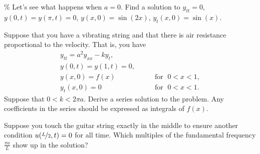 \documentclass{ximera}
\begin{document}
\begin{exercise}\%
    Let's see what happens when $a=0$.  Find a solution to $y_{tt} = 0$, $y(0,t) = y(\pi,t) = 0$, $y(x,0) = \sin(2x)$, $y_t(x,0) = \sin(x)$.
\end{exercise}

\begin{exercise}[challenging]
    Suppose that you have a vibrating string and that there is air resistance proportional to the velocity.  That is, you have
    \begin{equation*}
    \begin{array}{ll}
        y_{tt} = a^2 y_{xx} - k y_t , &  \\
        y(0,t) = y(1,t) = 0 , &  \\
        y(x,0) = f(x) & \qquad \text{for } \; 0 < x < 1 , \\
        y_t(x,0) = 0 & \qquad \text{for } \; 0 < x < 1 .
    \end{array}
    \end{equation*}
    Suppose that $0 < k < 2 \pi a$. Derive a series solution to the problem.  Any coefficients in the series should be expressed as integrals of $f(x)$.
\end{exercise}

\begin{exercise}
    Suppose you touch the guitar string exactly in the middle to ensure another condition $u(\nicefrac{L}{2},t) = 0$ for all time. Which multiples of the fundamental frequency $\frac{\pi a}{L}$ show up in the solution?
\end{exercise}

\end{document}
